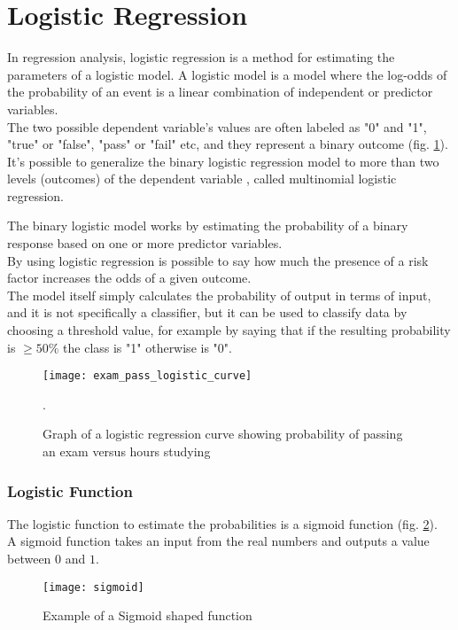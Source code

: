 \clearpage

\section{Logistic Regression} \label{logreg}
In regression analysis, logistic regression is a method for estimating the parameters of a logistic model. A logistic model is a model where the log-odds of the probability of an event is a linear combination of independent or predictor variables. \\
The two possible dependent variable's values are often labeled as "0" and "1", "true" or "false", "pass" or "fail" etc, and they represent a binary outcome (fig. \ref{fig:logistic_exam}). \\
It's possible to generalize the binary logistic regression model to more than two levels (outcomes) of the dependent variable \cite{wiki:logisticreg}, called multinomial logistic regression.

The binary logistic model works by estimating the probability of a binary response based on one or more predictor variables.\\
By using logistic regression is possible to say how much the presence of a risk factor increases the odds of a given outcome. \\
The model itself simply calculates the probability of output in terms of input, and it is not specifically a classifier, but it can be used to classify data by choosing a threshold value, for example by saying that if the resulting probability is $\ge 50\%$ the class is "1" otherwise is "0".

\begin{figure}[H]
	\centering
	\texttt{[image: exam\_pass\_logistic\_curve]}
	\caption{Graph of a logistic regression curve showing probability of passing an exam versus hours studying \cite{wiki:logisticreg}}.
	\label{fig:logistic_exam}
\end{figure}

\subsubsection{Logistic Function}
The logistic function to estimate the probabilities is a sigmoid function (fig. \ref{fig:sigmoid}). \\
A sigmoid function takes an input from the real numbers and outputs a value between $0$ and $1$.

\begin{figure}[H]
	\centering
	\texttt{[image: sigmoid]}
	\caption{Example of a Sigmoid shaped function}
	\label{fig:sigmoid}
\end{figure}

